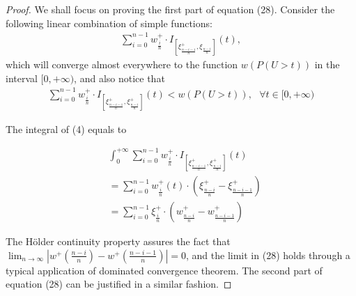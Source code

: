 \begin{proof}
We shall focus on proving the first part of equation (28). Consider the following linear combination of simple functions: 
\begin{align}
\sum_{i=0}^{n-1} w^+_{\frac{i}{n}} 
\cdot I_{[\xi^+_\frac{n-i-1}{n}, \xi_\frac{n-i}{n}]}(t),
\end{align}
which will converge almost everywhere to the function $w(P(U>t))$ in the interval $[0, +\infty)$, and also notice that 
\begin{align}
\sum_{i=0}^{n-1} w^+_{\frac{i}{n}} 
\cdot I_{[\xi^+_\frac{n-i-1}{n}, \xi^+_\frac{n-i}{n}]}(t)
<
w(P(U>t)),
\text{         } \forall t \in [0,+\infty)
\end{align}

The integral of (4) equals to 

\begin{align}
& \int_0^{+\infty} \sum_{i=0}^{n-1} w^+_{\frac{i}{n}} \cdot I_{[\xi^+_\frac{n-i-1}{n},
\xi^+_\frac{n-i}{n}]}(t) \\ & = \sum_{i=0}^{n-1} w^+_{\frac{i}{n}}(t) \cdot (\xi^+_{\frac{n-i}{n}} -
\xi^+_{\frac{n-i-1}{n}}) \\ & = \sum_{i=0}^{n-1} \xi^+_{\frac{i}{n}} \cdot (w^+_{\frac{n-i}{n}}-
    w^+_{\frac{n-i-1}{n}})
\end{align}

The H\"{o}lder continuity property assures the fact that 
$\lim_{n \rightarrow \infty}  | w^+(\frac{n-i}{n})- w^+(\frac{n-i-1}{n})| =0$, and the limit in (28) holds through a typical application of dominated convergence theorem.
The second part of equation (28) can be justified in a similar fashion.
\end{proof} 

